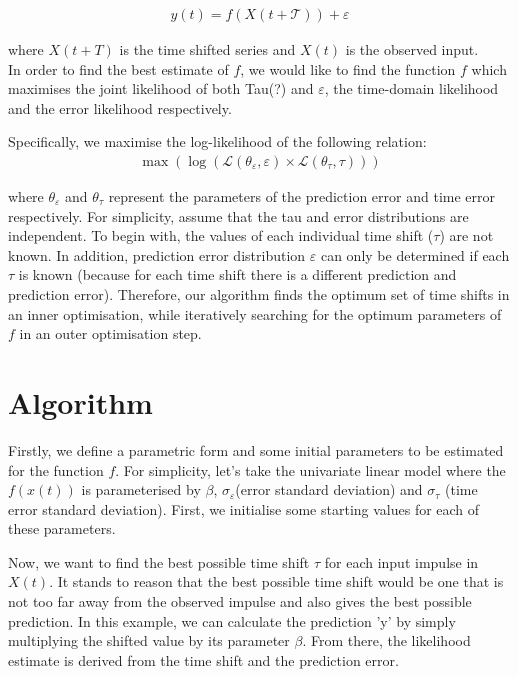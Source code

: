 \documentclass[11pt]{amsart}
\begin{document}
\begin{align}
y(t)= f(X(t + \mathcal{T})) + \varepsilon
\end{align}

where $X(t + T)$ is the time shifted series and $X(t)$ is the observed input.\\

In order to find the best estimate of $f$, we would like to find the function $f$ which maximises the joint likelihood of both Tau(?) and $\varepsilon$, the time-domain likelihood and the error likelihood respectively.

Specifically, we maximise the log-likelihood of the following relation:
\begin{align}
\max  \left( \log \left(\mathcal{L}(\theta_{\varepsilon}, \varepsilon) \times \mathcal{L}(\theta_{\tau}, \tau)\right) \right)
\end{align}

where $\theta_{\varepsilon}$ and $\theta_{\tau}$ represent the parameters of the prediction error and time error respectively. For simplicity, assume that the tau and error distributions are independent. To begin with, the values of each individual time shift ($\tau$) are not known. In addition, prediction error distribution $\varepsilon$ can only be determined if each $\tau$ is known (because for each time shift there is a different prediction and prediction error). Therefore, our algorithm finds the optimum set of time shifts  in an inner optimisation, while iteratively searching for the optimum parameters of $f$ in an outer optimisation step. 

\section{Algorithm}

Firstly, we define a parametric form and some initial parameters to be estimated for the function $f$. For simplicity, let's take the univariate linear model where the $f(x(t))$ is parameterised by $\beta$, $\sigma_{\varepsilon}$(error standard deviation)  and $\sigma_{\tau}$ (time error standard deviation). First, we initialise some starting values for each of these parameters.

Now, we want to find the best possible time shift $\tau$ for each input impulse in $X(t)$. It stands to reason that the best possible time shift would be one that is not too far away from the observed impulse and also gives the best possible prediction. In this example, we can calculate the prediction 'y' by simply multiplying the shifted value by its parameter $\beta$. From there, the likelihood estimate is derived from the time shift and the prediction error.
\end{document}

